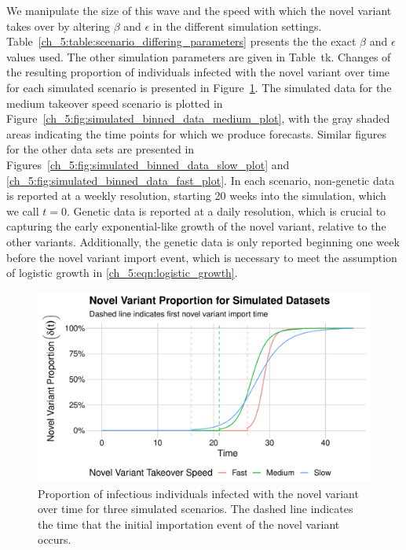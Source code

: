 We manipulate the size of this wave and the speed with which the novel variant takes over by altering \( \beta \) and \( \epsilon \) in the different simulation settings.
Table~\ref{ch_5:table:scenario_differing_parameters} presents the  the exact \( \beta \) and \( \epsilon \) values used.
The other simulation parameters are given in Table~tk.
Changes of the resulting proportion of individuals infected with the novel variant over time for each simulated scenario is presented in Figure~\ref{ch_5:fig:proportion_novel_variant_simulated_data_plot}.
The simulated data for the medium takeover speed scenario is plotted in Figure~\ref{ch_5:fig:simulated_binned_data_medium_plot}, with the gray shaded areas indicating the time points for which we produce forecasts.
Similar figures for the other data sets are presented in Figures~\ref{ch_5:fig:simulated_binned_data_slow_plot} and \ref{ch_5:fig:simulated_binned_data_fast_plot}.
In each scenario, non-genetic data is reported at a weekly resolution, starting 20 weeks into the simulation, which we call \( t = 0 \).
Genetic data is reported at a daily resolution, which is crucial to capturing the early exponential-like growth of the novel variant, relative to the other variants.
Additionally, the genetic data is only reported beginning one week before the novel variant import event, which is necessary to meet the assumption of logistic growth in \eqref{ch_5:eqn:logistic_growth}.

\begin{figure}
    \centering
    \includegraphics[width=1.0\columnwidth]{proportion_novel_variant_simulated_data_plot}
    \caption[Proportion of infectious individuals infected with the novel variant over time for three simulated scenarios.]{Proportion of infectious individuals infected with the novel variant over time for three simulated scenarios.
    The dashed line indicates the time that the initial importation event of the novel variant occurs.}
    \label{ch_5:fig:proportion_novel_variant_simulated_data_plot}
\end{figure}

